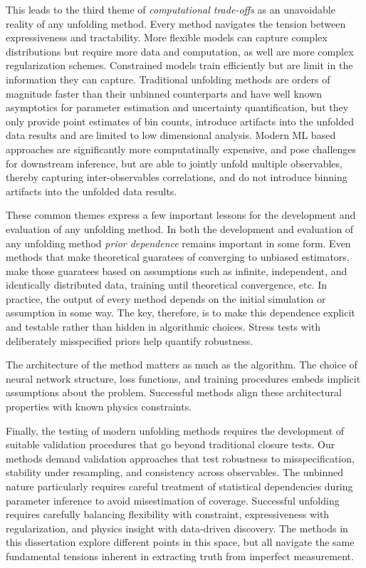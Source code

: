         This leads to the third theme of \emph{computational trade-offs} as an unavoidable reality of any unfolding method.
        Every method navigates the tension between expressiveness and tractability.
        More flexible models can capture complex distributions but require more data and computation, as well are more complex regularization schemes.
        Constrained models train efficiently but are limit in the information they can capture.
        Traditional unfolding methods are orders of magnitude faster than their unbinned counterparts and have well known asymptotics for parameter estimation and uncertainty quantification, but they only provide point estimates of bin counts, introduce artifacts into the unfolded data results and are limited to low dimensional analysis.
        Modern ML based approaches are significantly more computatinally expensive, and pose challenges for downstream inference, but are able to jointly unfold multiple observables, thereby capturing inter-observables correlations, and do not introduce binning artifacts into the unfolded data results.

    These common themes express a few important lessons for the development and evaluation of any unfolding method.
    In both the development and evaluation of any unfolding method \emph{prior dependence} remains important in some form.
    Even methods that make theoretical guaratees of converging to unbiased estimators, make those guaratees based on assumptions such as infinite, independent, and identically distributed data, training until theoretical convergence, etc.
    In practice, the output of every method depends on the initial simulation or assumption in some way.
    The key, therefore, is to make this dependence explicit and testable rather than hidden in algorithmic choices. Stress tests with deliberately misspecified priors help quantify robustness.
    
    The architecture of the method matters as much as the algorithm.
    The choice of neural network structure, loss functions, and training procedures embeds implicit assumptions about the problem.
    Successful methods align these architectural properties with known physics constraints.
        
    Finally, the testing of modern unfolding methods requires the development of suitable validation procedures that go beyond traditional closure tests.
    Our methods demand validation approaches that test robustness to misspecification, stability under resampling, and consistency across observables.
    The unbinned nature particularly requires careful treatment of statistical dependencies during parameter inference to avoid misestimation of coverage.
    Successful unfolding requires carefully balancing flexibility with constraint, expressiveness with regularization, and physics insight with data-driven discovery.
    The methods in this dissertation explore different points in this space, but all navigate the same fundamental tensions inherent in extracting truth from imperfect measurement.
